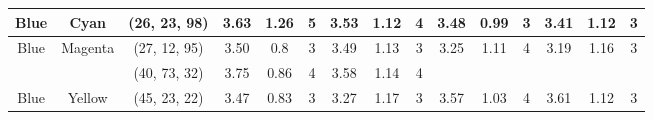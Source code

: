 \begin{table}[htbp]
{\begin{tabular}{@{}ccclcccccccccccc@{}}
    Blue                    & \multicolumn{1}{c|}{Cyan}                      & \multicolumn{2}{c|}{\cellcolor[HTML]{0080FF}(26, 23, 98)}  & \multicolumn{1}{c|}{3.63} & \multicolumn{1}{c|}{1.26}  & \multicolumn{1}{c|}{\cellcolor[HTML]{32CB00}\textbf{5}} & \multicolumn{1}{c|}{3.53} & \multicolumn{1}{c|}{1.12}  & \multicolumn{1}{c|}{4}                                  & \multicolumn{1}{c|}{3.48}                   & \multicolumn{1}{c|}{0.99}                   & \multicolumn{1}{c|}{3}                                  & \multicolumn{1}{c|}{3.41}                   & \multicolumn{1}{c|}{1.12}                   & \multicolumn{1}{c|}{3}                                                    \\ \midrule
    Blue                    & \multicolumn{1}{c|}{Magenta}                   & \multicolumn{2}{c|}{\cellcolor[HTML]{8000FF}(27, 12, 95)}  & \multicolumn{1}{c|}{3.50} & \multicolumn{1}{c|}{0.8}   & \multicolumn{1}{c|}{3}                                  & \multicolumn{1}{c|}{3.49} & \multicolumn{1}{c|}{1.13}  & \multicolumn{1}{c|}{3}                                  & \multicolumn{1}{c|}{3.25}                   & \multicolumn{1}{c|}{1.11}                   & \multicolumn{1}{c|}{4}                                  & \multicolumn{1}{c|}{3.19}                   & \multicolumn{1}{c|}{1.16}                   & \multicolumn{1}{c|}{3}                                                    \\ \midrule
                            & \multicolumn{1}{c|}{}                          & \multicolumn{2}{c|}{\cellcolor[HTML]{00FF80}(40, 73, 32)}  & \multicolumn{1}{c|}{3.75} & \multicolumn{1}{c|}{0.86}  & \multicolumn{1}{c|}{4}                                  & \multicolumn{1}{c|}{3.58} & \multicolumn{1}{c|}{1.14}  & \multicolumn{1}{c|}{4}                                  & \multicolumn{1}{c|}{}                       & \multicolumn{1}{c|}{}                       & \multicolumn{1}{c|}{}                                   & \multicolumn{1}{c|}{}                       & \multicolumn{1}{c|}{}                       & \multicolumn{1}{c|}{}                                                     \\ \cmidrule(lr){3-10}
    \multirow{-2}{*}{Blue}  & \multicolumn{1}{c|}{\multirow{-2}{*}{Yellow}}  & \multicolumn{2}{c|}{\cellcolor[HTML]{FF007F}(45, 23, 22)}  & \multicolumn{1}{c|}{3.47} & \multicolumn{1}{c|}{0.83}  & \multicolumn{1}{c|}{3}                                  & \multicolumn{1}{c|}{3.27} & \multicolumn{1}{c|}{1.17}  & \multicolumn{1}{c|}{3}                                  & \multicolumn{1}{c|}{\multirow{-2}{*}{3.57}} & \multicolumn{1}{c|}{\multirow{-2}{*}{1.03}} & \multicolumn{1}{c|}{\multirow{-2}{*}{4}}                & \multicolumn{1}{c|}{\multirow{-2}{*}{3.61}} & \multicolumn{1}{c|}{\multirow{-2}{*}{1.12}} & \multicolumn{1}{c|}{\multirow{-2}{*}{3}}                                  \\ \midrule

\end{tabular}}
\end{table}
